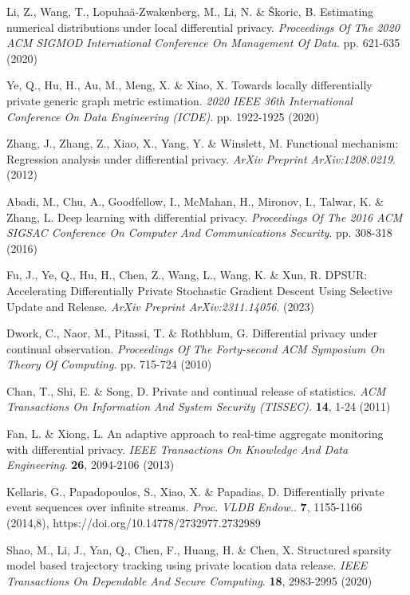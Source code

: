 \begin{thebibliography}{10}
\begin{small}
Li, Z., Wang, T., Lopuhaä-Zwakenberg, M., Li, N. \& Škoric, B. Estimating numerical distributions under local differential privacy. {\em Proceedings Of The 2020 ACM SIGMOD International Conference On Management Of Data}. pp. 621-635 (2020)

Ye, Q., Hu, H., Au, M., Meng, X. \& Xiao, X. Towards locally differentially private generic graph metric estimation. {\em 2020 IEEE 36th International Conference On Data Engineering (ICDE)}. pp. 1922-1925 (2020)

Zhang, J., Zhang, Z., Xiao, X., Yang, Y. \& Winslett, M. Functional mechanism: Regression analysis under differential privacy. {\em ArXiv Preprint ArXiv:1208.0219}. (2012)

Abadi, M., Chu, A., Goodfellow, I., McMahan, H., Mironov, I., Talwar, K. \& Zhang, L. Deep learning with differential privacy. {\em Proceedings Of The 2016 ACM SIGSAC Conference On Computer And Communications Security}. pp. 308-318 (2016)

Fu, J., Ye, Q., Hu, H., Chen, Z., Wang, L., Wang, K. \& Xun, R. DPSUR: Accelerating Differentially Private Stochastic Gradient Descent Using Selective Update and Release. {\em ArXiv Preprint ArXiv:2311.14056}. (2023)


Dwork, C., Naor, M., Pitassi, T. \& Rothblum, G. Differential privacy under continual observation. {\em Proceedings Of The Forty-second ACM Symposium On Theory Of Computing}. pp. 715-724 (2010)

Chan, T., Shi, E. \& Song, D. Private and continual release of statistics. {\em ACM Transactions On Information And System Security (TISSEC)}. \textbf{14}, 1-24 (2011)

Fan, L. \& Xiong, L. An adaptive approach to real-time aggregate monitoring with differential privacy. {\em IEEE Transactions On Knowledge And Data Engineering}. \textbf{26}, 2094-2106 (2013)

Kellaris, G., Papadopoulos, S., Xiao, X. \& Papadias, D. Differentially private event sequences over infinite streams. {\em Proc. VLDB Endow.}. \textbf{7}, 1155-1166 (2014,8), https://doi.org/10.14778/2732977.2732989

Shao, M., Li, J., Yan, Q., Chen, F., Huang, H. \& Chen, X. Structured sparsity model based trajectory tracking using private location data release. {\em IEEE Transactions On Dependable And Secure Computing}. \textbf{18}, 2983-2995 (2020)


\end{small}
\end{thebibliography}
